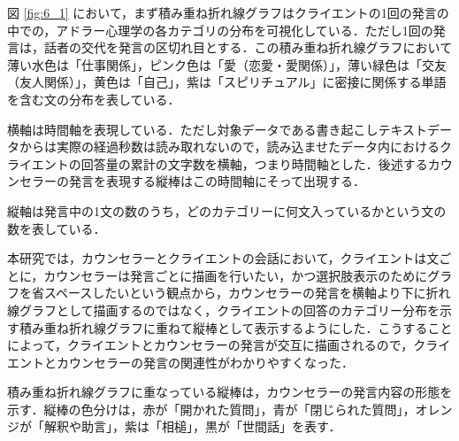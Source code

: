 \documentclass[shuuron]{kuee}
\begin{document}



図
\ref{fig:6_1}
において，まず積み重ね折れ線グラフはクライエントの1回の発言の中での，アドラー心理学の各カテゴリの分布を可視化している．ただし1回の発言は，話者の交代を発言の区切れ目とする．この積み重ね折れ線グラフにおいて薄い水色は「仕事関係」，ピンク色は「愛（恋愛・愛関係）」，薄い緑色は「交友（友人関係）」，黄色は「自己」，紫は「スピリチュアル」に密接に関係する単語を含む文の分布を表している．

横軸は時間軸を表現している．ただし対象データである書き起こしテキストデータからは実際の経過秒数は読み取れないので，読み込ませたデータ内におけるクライエントの回答量の累計の文字数を横軸，つまり時間軸とした．後述するカウンセラーの発言を表現する縦棒はこの時間軸にそって出現する．

縦軸は発言中の1文の数のうち，どのカテゴリーに何文入っているかという文の数を表している．



本研究では，カウンセラーとクライエントの会話において，クライエントは文ごとに，カウンセラーは発言ごとに描画を行いたい，かつ選択肢表示のためにグラフを省スペースしたいという観点から，カウンセラーの発言を横軸より下に折れ線グラフとして描画するのではなく，クライエントの回答のカテゴリー分布を示す積み重ね折れ線グラフに重ねて縦棒として表示するようにした．こうすることによって，クライエントとカウンセラーの発言が交互に描画されるので，クライエントとカウンセラーの発言の関連性がわかりやすくなった．

積み重ね折れ線グラフに重なっている縦棒は，カウンセラーの発言内容の形態を示す．縦棒の色分けは，赤が「開かれた質問」，青が「閉じられた質問」，オレンジが「解釈や助言」，紫は「相槌」，黒が「世間話」を表す．
\end{document}
